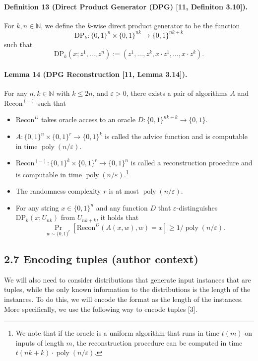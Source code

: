 \documentclass[10pt,a4paper]{article}
\begin{document}
\paragraph{Definition 13 (Direct Product Generator (DPG) [11, Definiton 3.10]).} For $k,n\in\mathbb N$, we define the $k$-wise direct product generator to be the function
\[\mathrm{DP}_k:\{0,1\}^n\times\{0,1\}^{nk}\to\{0,1\}^{nk+k}\]
such that
\[\mathrm{DP}_k(x;z^1,\ldots,z^n):=(z^1,\ldots,z^k,x\cdot z^1,\ldots,x\cdot z^k).\]
\paragraph{Lemma 14 (DPG Reconstruction [11, Lemma 3.14]).} For any $n,k\in\mathbb N$ with $k\leq2n$, and $\varepsilon>0$, there exists a pair of algorithms $A$ and $\mathrm{Recon}^{(-)}$ such that
\begin{itemize}
\item $\mathrm{Recon}^D$ takes oracle access to an oracle $D:\{0,1\}^{nk+k}\to\{0,1\}$.
\item $A:\{0,1\}^n\times\{0,1\}^r\to\{0,1\}^k$ is called the advice function and is computable in time $\operatorname{poly}(n/\varepsilon)$.
\item $\mathrm{Recon}^{(-)}:\{0,1\}^k\times\{0,1\}^r\to\{0,1\}^n$ is called a reconstruction procedure and is computable in time $\operatorname{poly}(n/\varepsilon)$.\footnote{We note that if the oracle is a uniform algorithm that runs in time $t(m)$ on inputs of length $m$, the reconstruction procedure can be computed in time $t(nk+k)\cdot\operatorname{poly}(n/\varepsilon)$.}
\item The randomness complexity $r$ is at most $\operatorname{poly}(n/\varepsilon)$.
\item For any string $x\in\{0,1\}^n$ and any function $D$ that $\varepsilon$-distinguishes $\mathrm{DP}_k(x;U_{nk})$ from $U_{nk+k}$, it holds that
\[\Pr_{w\sim\{0,1\}^r}[\mathrm{Recon}^D(A(x,w),w)=x]\geq1/\operatorname{poly}(n/\varepsilon).\]
\end{itemize}
\subsection*{2.7 Encoding tuples (author context)}
We will also need to consider distributions that generate input instances that are tuples, while the only known information to the distributions is the length of the instances. To do this, we will encode the format as the length of the instances. More specifically, we use the following way to encode tuples [3].
\end{document}
